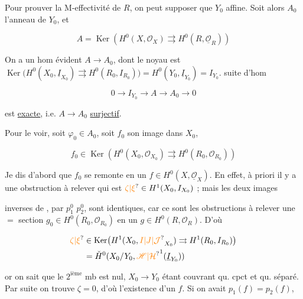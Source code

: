 Pour prouver la M-effectivité de $R$, on peut supposer que $Y_0$  affine. Soit alors $A_0$ l'anneau de $Y_0$, et  

\[
A=\operatorname{Ker}\left(H^0(X,\mathcal O_X)\rightrightarrows H^0(R,\underline{\mathcal O}_R)\right)
\]

On a un hom évident $A\longrightarrow A_0$, dont le noyau est $\operatorname{Ker}\bigl(H^0(X_0,\underline I_{X_0})\rightrightarrows H^0(R_0,I_{R_0})\bigr)=H^0(Y_0,\underline I_{Y_0})=I_{Y_0}$.    suite d'hom

\[
0\longrightarrow I_{Y_0}\longrightarrow A\longrightarrow A_0\longrightarrow0
\]

est \uline{exacte}, i.e. $A\longrightarrow A_0$ \uline{surjectif}.

Pour le voir,  soit $\varphi_0\in A_0$, soit $f_0$ son image  dans $X_0$,  

\[
f_0\in\operatorname{Ker}\left(H^0(X_0,\mathcal O_{X_0})\rightrightarrows H^0(R_0,\mathcal O_{R_0})\right)
\]

Je dis d'abord que $f_0$ se remonte en un $f\in H^0(X,\underline{\mathcal O}_X)$. En effet, à priori il y a une obstruction à relever qui est  $\unsure{\zeta|\xi}\in H^1(X_0,I_{X_0})$ ; mais les deux images

inverses de  , par $p_1^0$  $p_2^0$, sont identiques, car ce sont les obstructions à relever une $=$ section $g_0\in H^0(R_0,\mathcal O_{R_0})$ en un $g\in H^0(R,\mathcal O_R)$. D'où

\[
\begin{aligned}
\unsure{\zeta|\xi}&\in\operatorname{Ker}\bigl(H^1(X_0,\unsure{I|J|\mathcal J}_{X_0})\rightrightarrows H^1(R_0,I_{R_0})\bigr)\\
&=\check H^0(X_0/Y_0,{\unsure{\mathscr H|\mathcal H}}^1(\underline I_{Y_0}))
\end{aligned}
\]

or on sait que le $2^{\mathrm{ième}}$ mb est nul, $X_0\longrightarrow Y_0$ étant couvrant qu. cpct et qu. séparé. Par suite on trouve $\zeta=0$, d'où l'existence d'un $f$. Si on avait  $p_1(f)=p_2(f)$,

